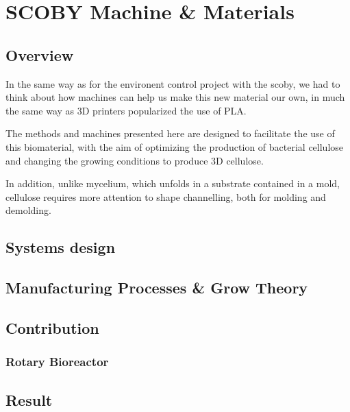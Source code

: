 \chapter{SCOBY Machine \& Materials}


\section{Overview}

In the same way as for the environent control project with the scoby, we had to think about how machines can help us make this new material our own, in much the same way as 3D printers popularized the use of PLA. 

The methods and machines presented here are designed to facilitate the use of this biomaterial, with the aim of optimizing the production of bacterial cellulose and changing the growing conditions to produce 3D cellulose. 

In addition, unlike mycelium, which unfolds in a substrate contained in a mold, cellulose requires more attention to shape channelling, both for molding and demolding. 


\section{Systems design}

\section{Manufacturing Processes \& Grow Theory}

\section{Contribution}

\subsection{Rotary Bioreactor}


\section{Result}

